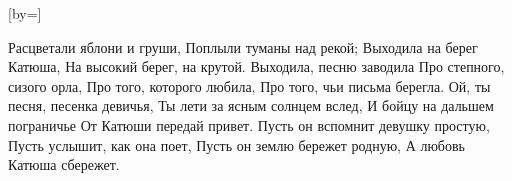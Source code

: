 [by={}]

\beginverse
Расцветали яблони и груши,
Поплыли туманы над рекой;
Выходила на берег Катюша,
На высокий берег, на крутой.
\endverse
\beginverse
Выходила, песню заводила
Про степного, сизого орла,
Про того, которого любила,
Про того, чьи письма берегла.
\endverse
\beginverse
Ой, ты песня, песенка девичья,
Ты лети за ясным солнцем вслед,
И бойцу на дальшем пограничье
От Катюши передай привет.
\endverse
\beginverse
Пусть он вспомнит девушку простую,
Пусть услышит, как она поет,
Пусть он землю бережет родную,
А любовь Катюша сбережет.
\endverse

\endsong
